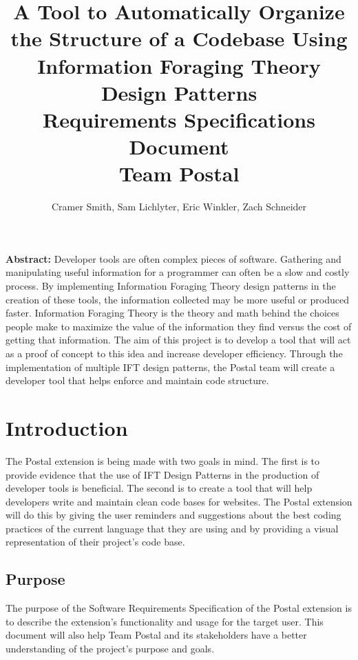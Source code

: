 \documentclass[letterpaper,10pt,titlepage,draftclsnofoot,onecolumn,onesided] {IEEEtran}
\def\doctitle{A Tool to Automatically Organize the Structure of a Codebase Using Information Foraging Theory Design Patterns}
\def\doctype{Requirements Specifications Document}
\def\team{Team Postal}
\begin{document}
\title{\Huge{\bfseries{\textsf{\doctitle}}}\\\textsf{\Large{\doctype}}\\\textsf{\large{\team}}}
\author{Cramer Smith, Sam Lichlyter, Eric Winkler, Zach Schneider}

\maketitle
\vfill

\setlength\parindent{0pt} \textbf{Abstract:} Developer tools are often complex pieces of software. 
Gathering and manipulating useful information for a programmer can often be a slow and costly process. 
By implementing Information Foraging Theory design patterns in the creation of these tools, the information collected may be more useful or produced faster. 
Information Foraging Theory is the theory and math behind the choices people make to maximize the value of the information they find versus the cost of getting that information.
The aim of this project is to develop a tool that will act as a proof of concept to this idea and increase developer efficiency.
Through the implementation of multiple IFT design patterns, the Postal team will create a developer tool that helps enforce and maintain code structure. 

\vfill

\pagebreak

\tableofcontents

\pagebreak

\section{Introduction}

The Postal extension is being made with two goals in mind.
The first is to provide evidence that the use of IFT Design Patterns in the production of developer tools is beneficial. 
The second is to create a tool that will help developers write and maintain clean code bases for websites.
The Postal extension will do this by giving the user reminders and suggestions about the best coding practices of the current language that they are using and by providing a visual representation of their project's code base.

\subsection{Purpose}
The purpose of the Software Requirements Specification of the Postal extension is to describe the extension's functionality and usage for the target user. 
This document will also help Team Postal and its stakeholders have a better understanding of the project's purpose and goals.
\end{document}
